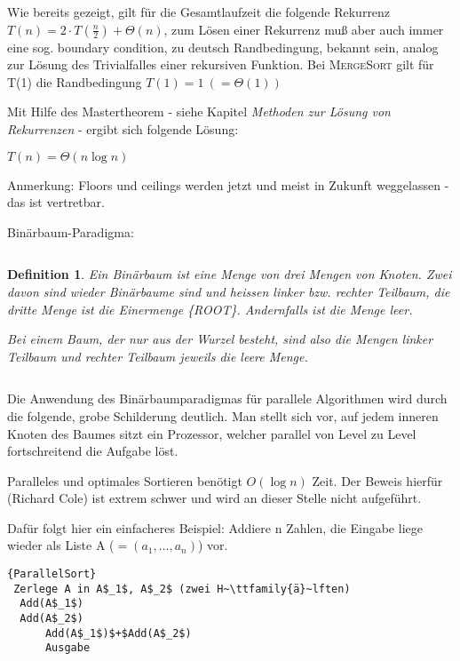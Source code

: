 \documentclass[ngerman,draft,parskip=half*,twoside]{scrreprt}
\theoremstyle{break}
\newtheorem{definition}{Definition}
\begin{document}
Wie bereits gezeigt, gilt für die Gesamtlaufzeit die folgende Rekurrenz $T(n) = 2\cdot T(\frac{n}{2})+\Theta(n)$, zum Lösen einer
Rekurrenz muß aber auch immer eine sog. boundary condition, zu deutsch Randbedingung, bekannt sein, analog zur Lösung des Trivialfalles einer rekursiven
Funktion. Bei \textsc{MergeSort} gilt für T(1) die Randbedingung $T(1) = 1\ (=\Theta(1))$

Mit Hilfe des Mastertheorem - siehe Kapitel \textit{Methoden zur Lösung von Rekurrenzen} - ergibt sich folgende Lösung:

$T(n) = \Theta(n \log n)$ 

Anmerkung: Floors und ceilings werden jetzt und meist in Zukunft weggelassen - das ist vertretbar.

\begin{description}
	\item [Binärbaum-Paradigma:] 
\end{description}
	
$  $

\begin{definition}
	  Ein Binärbaum ist eine Menge von drei Mengen von Knoten. Zwei davon sind wieder Binärbaume sind und heissen linker bzw.
	  rechter Teilbaum, die dritte Menge ist die Einermenge \{ROOT\}. Andernfalls ist die Menge leer.
	  
	  Bei einem Baum, der nur aus der Wurzel besteht, sind also die Mengen linker Teilbaum und rechter Teilbaum jeweils die leere
	  Menge.
\end{definition}

$  $

Die Anwendung des Binärbaumparadigmas für parallele Algorithmen wird durch die folgende, grobe Schilderung deutlich.
Man stellt sich vor, auf jedem inneren Knoten des Baumes sitzt ein Prozessor, welcher parallel von Level zu Level fortschreitend die
Aufgabe löst.

Paralleles und optimales Sortieren benötigt $O(\log n)$ Zeit. Der Beweis hierfür (Richard Cole) ist extrem schwer und wird an dieser Stelle nicht aufgeführt.

Dafür folgt hier ein einfacheres Beispiel: Addiere n Zahlen, die Eingabe liege wieder als Liste A ($=(a_1,\ldots,a_n)$) vor.

\begin{Algorithmus}[h]
\begin{lstlisting}[frame=tlrb, mathescape=true, title=\textsc{ParallelSort}, gobble=1]{ParallelSort}
 Zerlege A in A$_1$, A$_2$ (zwei H~\ttfamily{ä}~lften)
  Add(A$_1$)
  Add(A$_2$)
      Add(A$_1$)$+$Add(A$_2$)
      Ausgabe
      \end{lstlisting}
  \end{Algorithmus}
\end{document}
